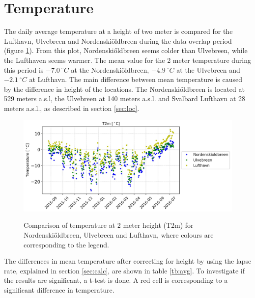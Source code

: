 \documentclass[11pt]{report}
\begin{document}
\section{Temperature} \label{sec:T}
The daily average temperature at a height of two meter is compared for the Lufthavn, Ulvebreen and Nordenski\H{o}ldbreen during the data overlap period (figure \ref{fig:T2m}). From this plot, Nordenski\H{o}ldbreen seems colder than Ulvebreen, while the Lufthaven seems warmer. The mean value for the 2 meter temperature during this period is $\SI{-7.0}{^{\circ}C}$ at the Nordenski\H{o}ldbreen, $\SI{-4.9}{^{\circ}C}$ at the Ulvebreen and $\SI{-2.1}{^{\circ}C}$ at Lufthavn. The main difference between mean temperature is caused by the difference in height of the locations. The Nordenski\H{o}ldbreen is located at 529 meters a.s.l, the Ulvebreen at 140 meters a.s.l. and Svalbard Lufthavn at 28 meters a.s.l., as described in section \ref{sec:loc}. 

\begin{figure}[h]
\centering{}
    \includegraphics[scale=1, width=1\textwidth]{T2m.jpg}
    \label{fig:T2m}
    \caption{Comparison of temperature at 2 meter height (T2m) for Nordenski\H{o}ldbreen, Ulvebreen and Lufthavn, where colours are corresponding to the legend.}
\end{figure}

The differences in mean temperature after correcting for height by using the lapse rate, explained in section \ref{sec:calc}, are shown in table \ref{tb:avg}. To investigate if the results are significant, a t-test is done. A red cell is corresponding to a significant difference in temperature. 
\end{document}

